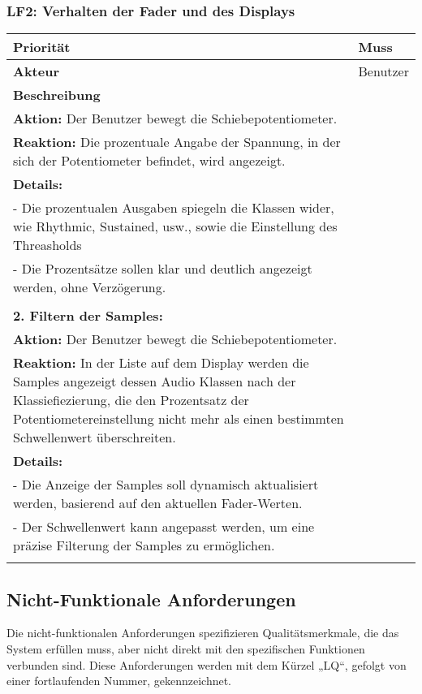 \newpage
\subsubsection{LF2: Verhalten der Fader und des Displays}

\begin{longtable}[c]{|p{3cm}|p{13cm}|}
\hline
\textbf{Priorität} & Muss \\
\hline
\textbf{Akteur} & Benutzer \\
\hline
\textbf{Beschreibung} & 
\begin{tabularx}{13cm}{X}
\textbf{1. Anzeige der Fader-Werte:} \\
\textbf{Aktion:} Der Benutzer bewegt die Schiebepotentiometer. \\
\textbf{Reaktion:} Die prozentuale Angabe der Spannung, in der sich der Potentiometer befindet, wird angezeigt. \\
\textbf{Details:} \\
- Die prozentualen Ausgaben spiegeln die Klassen wider, wie Rhythmic, Sustained, usw., sowie die Einstellung des Threasholds \\
- Die Prozentsätze sollen klar und deutlich angezeigt werden, ohne Verzögerung. \\
\\
\textbf{2. Filtern der Samples:} \\
\textbf{Aktion:} Der Benutzer bewegt die Schiebepotentiometer. \\
\textbf{Reaktion:} In der Liste auf dem Display werden die Samples angezeigt dessen Audio Klassen nach der Klassiefiezierung, die den Prozentsatz der Potentiometereinstellung nicht mehr als einen bestimmten Schwellenwert überschreiten. \\
\textbf{Details:} \\
- Die Anzeige der Samples soll dynamisch aktualisiert werden, basierend auf den aktuellen Fader-Werten. \\
- Der Schwellenwert kann angepasst werden, um eine präzise Filterung der Samples zu ermöglichen. \\
\end{tabularx} \\
\hline
\end{longtable}

\newpage
\subsection{Nicht-Funktionale Anforderungen}
Die nicht-funktionalen Anforderungen spezifizieren Qualitätsmerkmale, die das System erfüllen muss, aber nicht direkt mit den spezifischen Funktionen verbunden sind. Diese Anforderungen werden mit dem Kürzel „LQ“, gefolgt von einer fortlaufenden Nummer, gekennzeichnet.

